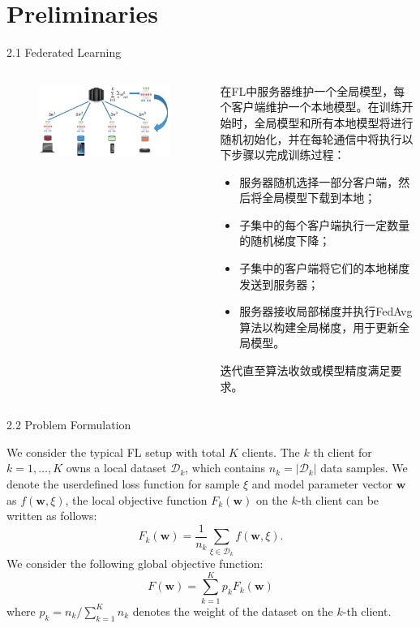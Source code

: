 \documentclass{sintefbeamer}
\theoremstyle{definition}
\begin{document}
\section{Preliminaries}

\begin{frame}{2.1 Federated Learning}

\begin{columns}
\begin{column}{0.4\textwidth}
\begin{figure}[ht]
\centering
\includegraphics[width=1\textwidth]{images/fl_arch}
\end{figure}
\end{column}
\begin{column}{0.6\textwidth}
 在FL中服务器维护一个全局模型，每个客户端维护一个本地模型。在训练开始时，全局模型和所有本地模型将进行随机初始化，并在每轮通信中将执行以下步骤以完成训练过程：
\begin{itemize}
\item 服务器随机选择一部分客户端，然后将全局模型下载到本地；
\item 子集中的每个客户端执行一定数量的随机梯度下降；
\item 子集中的客户端将它们的本地梯度发送到服务器；
\item 服务器接收局部梯度并执行FedAvg算法以构建全局梯度，用于更新全局模型。
\end{itemize}
迭代直至算法收敛或模型精度满足要求。
\end{column}
\end{columns}
\end{frame}

\begin{frame}{2.2 Problem Formulation}

We consider the typical FL setup with total $K$ clients. The $k$ th client for $k=1, \ldots, K$ owns a local dataset $\mathcal{D}_k$, which contains $n_k=\left|\mathcal{D}_k\right|$ data samples. We denote the userdefined loss function for sample $\xi$ and model parameter vector $\mathbf{w}$ as $f(\mathbf{w}, \xi)$, the local objective function $F_k(\mathbf{w})$ on the $k$-th client can be written as follows:
$$
F_k(\mathbf{w})=\frac{1}{n_k} \sum_{\xi \in \mathcal{D}_k} f(\mathbf{w}, \xi) .
$$
We consider the following global objective function:
$$
F(\mathbf{w})=\sum_{k=1}^K p_k F_k(\mathbf{w})
$$
where $p_k=n_k / \sum_{k=1}^K n_k$ denotes the weight of the dataset on the $k$-th client. 
\end{frame}
\end{document}
